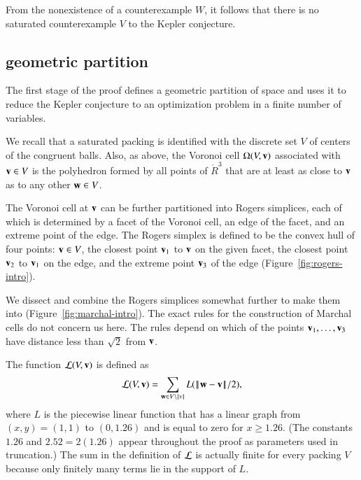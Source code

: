 From the nonexistence of a counterexample $W$, 
it follows that there is no saturated
counterexample $V$ to the Kepler conjecture.



\subsection{geometric partition}

The first stage of the proof defines a geometric partition of space
and uses it to reduce the Kepler conjecture to an optimization problem
in a finite number of variables.

We recall that a saturated packing is
identified with the discrete set $V$ of centers of the
congruent balls.  Also, as above, the Voronoi cell $\Omega(V,{\mathbf v})$
associated with ${\mathbf v}\in V$ is the polyhedron formed by all points of
$\ring{R}^3$ that are at least as close to ${\mathbf v}$ as to any other ${\mathbf w}\in
V$.   

The Voronoi cell at ${\mathbf v}$ can be further partitioned into Rogers
simplices, each of which is determined by a facet of the Voronoi cell, an edge of
the facet, and an extreme point of the edge.  The Rogers simplex is defined to be the
convex hull of four points: ${\mathbf v}\in V$, the closest point ${\mathbf v}_1$ to ${\mathbf v}$ on the given facet, the closest point ${\mathbf v}_2$ to ${\mathbf v}_1$ on the edge, and the
extreme point ${\mathbf v}_3$ of the edge (Figure~\ref{fig:rogers-intro}).

\figORQISJR %

We dissect and combine the Rogers simplices somewhat further to make
them into  (Figure~\ref{fig:marchal-intro}).  
The exact rules for the
construction of Marchal cells do not concern us here.  The rules
depend on which of the points ${\mathbf v}_1,\ldots,{\mathbf v}_3$ have distance less
than $\sqrt2$ from ${\mathbf v}$.
%

\figODGBUWK %

The function
 ${\mathcal L}(V,{\mathbf v})$ is defined as
\begin{equation}\label{eqn:LV0}
\CalL(V,\v) = \sum_{\w\in V\setminus\{v\}} L(\norm{\w}{\v}/2),
\end{equation}
where $L$ is the piecewise linear function that has a linear graph from
$(x,y)=(1,1)$ to $(0,1.26)$ and is equal to zero for $x\ge 1.26$.  (The
constants $1.26$ and $2.52=2(1.26)$ appear throughout the proof as
parameters used in truncation.)   
The sum in the definition of ${\mathcal L}$ is actually finite for every packing $V$ because only finitely many terms
lie in the support of $L$. 

